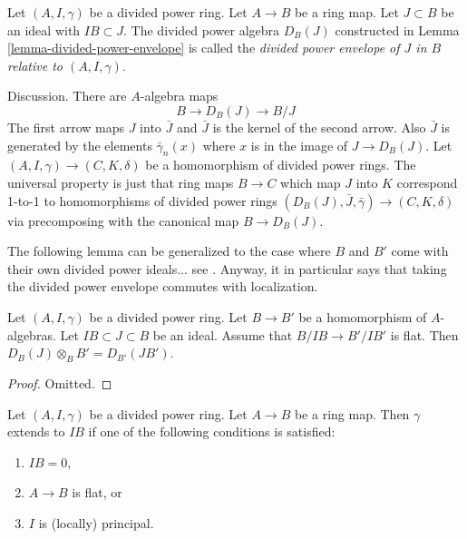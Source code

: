 \begin{definition}
\label{definition-divided-power-envelope}
Let $(A, I, \gamma)$ be a divided power ring.
Let $A \to B$ be a ring map. Let $J \subset B$ be an ideal
with $IB \subset J$. The divided power algebra $D_B(J)$
constructed in Lemma \ref{lemma-divided-power-envelope}
is called the {\it divided power envelope of $J$ in $B$
relative to $(A, I, \gamma)$}.
\end{definition}

\noindent
Discussion. There are $A$-algebra maps
\begin{equation}
\label{equation-divided-power-envelope}
B \longrightarrow D_B(J) \longrightarrow B/J
\end{equation}
The first arrow maps $J$ into $\bar J$ and $\bar J$ is the kernel
of the second arrow. Also $\bar J$ is generated by the elements
$\bar\gamma_n(x)$ where $x$ is in the image of $J \to D_B(J)$.
Let $(A, I, \gamma) \to (C, K, \delta)$ be a homomorphism of divided
power rings. The universal property is
just that ring maps $B \to C$ which map $J$ into $K$ correspond
1-to-1 to homomorphisms of divided power rings
$(D_B(J), \bar J, \bar \gamma) \to (C, K, \delta)$ via precomposing with the
canonical map $B \to D_B(J)$.

\medskip\noindent
The following lemma can be generalized to the case where $B$ and $B'$
come with their own divided power ideals... see
\cite[Proposition 2.1.7]{dJ-crystalline}.
Anyway, it in particular says that taking the divided power
envelope commutes with localization.

\begin{lemma}
\label{lemma-flat-base-change-divided-power-envelope}
Let $(A, I, \gamma)$ be a divided power ring.
Let $B \to B'$ be a homomorphism of $A$-algebras.
Let $IB \subset J \subset B$ be an ideal.
Assume that $B/IB \to B'/IB'$ is flat.
Then $D_B(J) \otimes_B B' = D_{B'}(JB')$.
\end{lemma}

\begin{proof}
Omitted.
\end{proof}

\begin{lemma}
\label{lemma-gamma-extends}
Let $(A, I, \gamma)$ be a divided power ring.
Let $A \to B$ be a ring map. Then $\gamma$ 
extends to $IB$ if one of the following conditions is satisfied:
\begin{enumerate}
\item $IB = 0$,
\item $A \to B$ is flat, or
\item $I$ is (locally) principal.
\end{enumerate}
\end{lemma}

